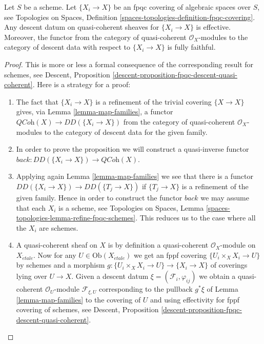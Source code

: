\begin{proposition}
\label{proposition-fpqc-descent-quasi-coherent}
Let $S$ be a scheme.
Let $\{X_i \to X\}$ be an fpqc covering of algebraic spaces over $S$, see
Topologies on Spaces,
Definition \ref{spaces-topologies-definition-fpqc-covering}.
Any descent datum on quasi-coherent sheaves
for $\{X_i \to X\}$ is effective.
Moreover, the functor from the category of
quasi-coherent $\mathcal{O}_X$-modules to the category
of descent data with respect to $\{X_i \to X\}$ is fully faithful.
\end{proposition}

\begin{proof}
This is more or less a formal consequence of
the corresponding result for schemes, see
Descent, Proposition \ref{descent-proposition-fpqc-descent-quasi-coherent}.
Here is a strategy for a proof:
\begin{enumerate}
\item The fact that $\{X_i \to X\}$ is a refinement of the trivial
covering $\{X \to X\}$ gives, via
Lemma \ref{lemma-map-families},
a functor $\textit{QCoh}(X) \to DD(\{X_i \to X\})$ from the category of
quasi-coherent $\mathcal{O}_X$-modules to the category of descent data
for the given family.
\item In order to prove the proposition we will construct a
quasi-inverse functor $back : DD(\{X_i \to X\}) \to \textit{QCoh}(X)$.
\item Applying again
Lemma \ref{lemma-map-families}
we see that there is a functor
$DD(\{X_i \to X\}) \to DD(\{T_j \to X\})$
if $\{T_j \to X\}$ is a refinement of the given family.
Hence in order to construct the functor $back$ we may assume that
each $X_i$ is a scheme, see
Topologies on Spaces,
Lemma \ref{spaces-topologies-lemma-refine-fpqc-schemes}.
This reduces us to the case where all the $X_i$ are schemes.
\item A quasi-coherent sheaf on $X$ is by definition a quasi-coherent
$\mathcal{O}_X$-module on $X_{\acute{e}tale}$. Now for any
$U \in \text{Ob}(X_{\acute{e}tale})$ we get an fppf covering
$\{U_i \times_X X_i \to U\}$ by schemes and a morphism
$g : \{U_i \times_X X_i \to U\} \to \{X_i \to X\}$ of coverings
lying over $U \to X$. Given a descent datum
$\xi = (\mathcal{F}_i, \varphi_{ij})$ we obtain a quasi-coherent
$\mathcal{O}_U$-module $\mathcal{F}_{\xi, U}$ corresponding
to the pullback $g^*\xi$ of
Lemma \ref{lemma-map-families}
to the covering of $U$ and using effectivity for fppf covering of schemes, see
Descent, Proposition \ref{descent-proposition-fpqc-descent-quasi-coherent}.

\end{enumerate}
\end{proof}
